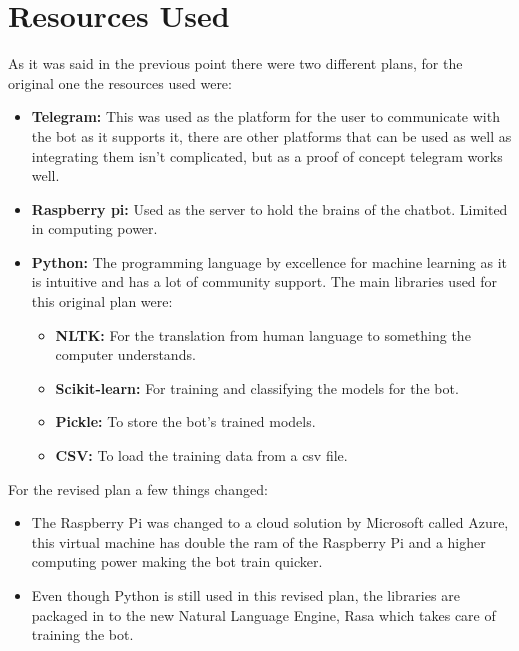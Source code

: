 \section{Resources Used}\label{sec:chap1_res}
As it was said in the previous point there were two different plans, for the original one the resources used were:\\	
\begin{itemize}
	\item{\textbf{Telegram:} This was used as the platform for the user to communicate with the bot as it supports it, there are other platforms that can be used as well as integrating them isn’t complicated, but as a proof of concept telegram works well.}
	\item{\textbf{Raspberry pi:} Used as the server to hold the brains of the chatbot. Limited in computing power.}
	\item{\textbf{Python:} The programming language by excellence for machine learning as it is intuitive and has a lot of community support. The main libraries used for this original plan were:
		\begin{itemize}
			\item{\textbf{NLTK:} For the translation from human language to something the computer understands.}
			\item{\textbf{Scikit-learn:} For training and classifying the models for the bot.}
			\item{\textbf{Pickle:} To store the bot’s trained models.}
			\item{\textbf{CSV:} To load the training data from a csv file.}
		\end{itemize}	 
	}
\end{itemize}
For the revised plan a few things changed:
\begin{itemize}
\item{The Raspberry Pi was changed to a cloud solution by Microsoft called Azure, this virtual machine has double the ram of the Raspberry Pi and a higher computing power making the bot train quicker.}
\item{Even though Python is still used in this revised plan, the libraries are packaged in to the new Natural Language Engine, Rasa which takes care of training the bot.}
\end{itemize}
	
